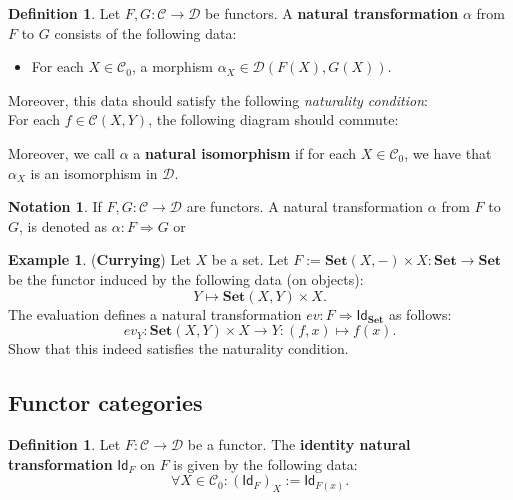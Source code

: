 \documentclass[a4paper,10pt]{scrartcl}
\theoremstyle{plain}
\theoremstyle{definition}
\newtheorem{dfn}[thm]{Definition}
\newtheorem{exa}[thm]{Example}
\newtheorem{nota}[thm]{Notation}
\newcommand{\cfont}[1]{\ensuremath{\mathsf{#1}}}
\newcommand{\Cat}[1]{\mathcal{#1}}
\newcommand{\CC}{\Cat{C}}
\newcommand{\DD}{\Cat{D}}
\newcommand{\Catb}[1]{\mathbf{#1}}
\newcommand{\SET}{\Catb{Set}}
\newcommand{\Ob}[1]{{#1}_0}
\newcommand{\CHom}[3]{{#1}(#2,#3)}
\newcommand{\Id}[1][]{\cfont{Id}_{#1}}
\newcommand{\NatTrans}[3]{#1 : #2 \Rightarrow #3}
\begin{document}
\begin{dfn} Let $F,G: \CC\to\DD$ be functors. A \textbf{natural transformation} $\alpha$ from $F$ to $G$ consists of the following data:
\begin{itemize}
\item For each $X\in \Ob{\CC}$, a morphism $\alpha_X \in \CHom{\DD}{F(X)}{G(X)}$.
\end{itemize}
Moreover, this data should satisfy the following \textit{naturality condition}:\\
For each $f\in \CHom{\CC}{X}{Y}$, the following diagram should commute:
\begin{center}
\end{center}
Moreover, we call $\alpha$ a \textbf{natural isomorphism} if for each $X\in\Ob{\CC}$, we have that $\alpha_X$ is an isomorphism in $\DD$.
\end{dfn}

\begin{nota} If $F,G:\CC\to\DD$ are functors. A natural transformation $\alpha$ from $F$ to $G$, is denoted as $\NatTrans{\alpha}{F}{G}$ or 
\begin{center}
\end{center}
\end{nota}

\begin{exa} (\textbf{Currying}) Let $X$ be a set. Let $F := \SET(X, -)\times X : \SET\to\SET$ be the functor induced by the following data (on objects):
\[
Y\mapsto \SET(X,Y)\times X.
\]
The evaluation defines a natural transformation $\NatTrans{ev}{F}{\Id[\SET]}$ as follows:
\[
ev_Y : \SET(X,Y) \times X \to Y : (f,x) \mapsto f(x).
\]
Show that this indeed satisfies the naturality condition.
\end{exa}

\subsection{Functor categories}
\begin{dfn}\label{dfn:nattrans_id} Let $F:\CC\to\DD$ be a functor. The \textbf{identity natural transformation} $\Id[F]$ on $F$ is given by the following data:
\[
\forall X\in\Ob{\CC}: (\Id[F])_{X} := \Id[F(x)].
\]
\end{dfn}
\end{document}
